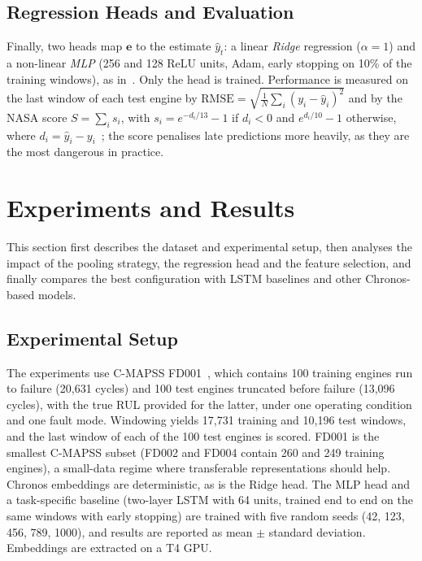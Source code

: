 \documentclass{svproc}
\begin{document}
\subsection{Regression Heads and Evaluation}

Finally, two heads map $\mathbf{e}$ to the estimate $\hat{y}_t$: a
linear \textit{Ridge} regression ($\alpha = 1$) and a non-linear
\textit{MLP} (256 and 128 ReLU units, Adam, early stopping on 10\% of the
training windows), as in~\cite{imsa2025}. Only the head is trained. Performance is measured on the last window of each test
engine by $\text{RMSE} = \sqrt{\tfrac{1}{N}\sum_{i}(y_i - \hat{y}_i)^2}$
and by the NASA score $S = \sum_i s_i$, with $s_i = e^{-d_i/13} - 1$ if
$d_i < 0$ and $e^{d_i/10} - 1$ otherwise, where
$d_i = \hat{y}_i - y_i$~\cite{saxena2008}; the score penalises late
predictions more heavily, as they are the most dangerous in practice.

\section{Experiments and Results}

This section first describes the dataset and experimental setup, then
analyses the impact of the pooling strategy, the regression head and the
feature selection, and finally compares the best configuration with LSTM
baselines and other Chronos-based models.

\subsection{Experimental Setup}

The experiments use C-MAPSS FD001~\cite{cmapss}, which contains 100
training engines run to failure (20,631 cycles) and 100 test engines
truncated before failure (13,096 cycles), with the true RUL provided for
the latter, under one operating condition and one fault mode. Windowing
yields 17,731 training and 10,196 test windows, and the last window of
each of the 100 test engines is scored. FD001 is the smallest C-MAPSS
subset (FD002 and FD004 contain 260 and 249 training engines), a
small-data regime where transferable representations should help. Chronos embeddings are
deterministic, as is the Ridge head. The MLP head and a task-specific
baseline (two-layer LSTM with 64 units, trained end to end on the same
windows with early stopping) are trained with five random seeds (42, 123,
456, 789, 1000), and results are reported as mean $\pm$ standard
deviation. Embeddings are extracted on a T4 GPU.
\end{document}
